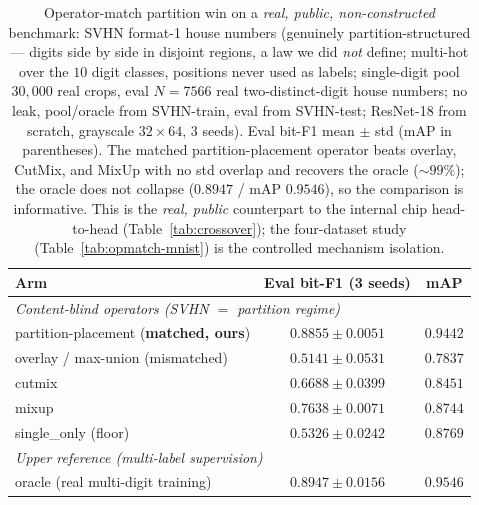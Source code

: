 \documentclass[11pt]{article}
\begin{document}
\begin{table}[t]
\centering
\caption{Operator-match partition win on a \emph{real, public, non-constructed} benchmark:
SVHN format-1 house numbers (genuinely partition-structured --- digits side by side in
disjoint regions, a law we did \emph{not} define; multi-hot over the $10$ digit classes,
positions never used as labels; single-digit pool $30{,}000$ real crops, eval $N{=}7566$
real two-distinct-digit house numbers; no leak, pool/oracle from SVHN-train, eval from
SVHN-test; ResNet-18 from scratch, grayscale $32{\times}64$, $3$ seeds). Eval bit-F1
mean $\pm$ std (mAP in parentheses). The matched partition-placement operator beats overlay,
CutMix, and MixUp with no std overlap and recovers the oracle (${\sim}99\%$); the oracle
does not collapse ($0.8947$ / mAP $0.9546$), so the comparison is informative. This is the
\emph{real, public} counterpart to the internal chip head-to-head
(Table~\ref{tab:crossover}); the four-dataset study (Table~\ref{tab:opmatch-mnist}) is the
controlled mechanism isolation.}
\label{tab:svhn}
\begin{tabular}{lcc}
\toprule
Arm & Eval bit-F1 (3 seeds) & mAP \\
\midrule
\multicolumn{3}{l}{\emph{Content-blind operators (SVHN $=$ partition regime)}} \\
partition-placement (\textbf{matched, ours}) & $\mathbf{0.8855 \pm 0.0051}$ & $\mathbf{0.9442}$ \\
overlay / max-union (mismatched)             & $0.5141 \pm 0.0531$ & $0.7837$ \\
cutmix                                       & $0.6688 \pm 0.0399$ & $0.8451$ \\
mixup                                        & $0.7638 \pm 0.0071$ & $0.8744$ \\
single\_only (floor)                         & $0.5326 \pm 0.0242$ & $0.8769$ \\
\midrule
\multicolumn{3}{l}{\emph{Upper reference (multi-label supervision)}} \\
oracle (real multi-digit training)           & $0.8947 \pm 0.0156$ & $0.9546$ \\
\bottomrule
\end{tabular}
\end{table}
\end{document}
